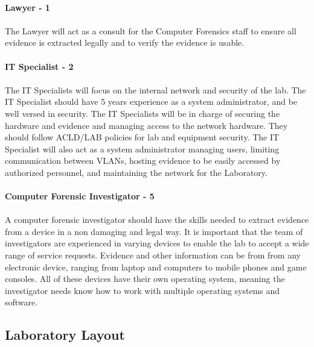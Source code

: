 \documentclass{article}
\begin{document}
\paragraph{Lawyer - 1} 
\paragraph{} The Lawyer will act as a consult for the Computer Forensics staff to ensure all evidence is extracted legally and to verify the evidence is usable.

\paragraph{IT Specialist - 2}
\paragraph{}
The IT Specialists will focus on the internal network and security of the lab.
The IT Specialist should have 5 years experience as a system administrator, and be well versed in security.
The IT Specialists will be in charge of securing the hardware and evidence and managing access to the network hardware.
They should follow ACLD/LAB policies for lab and equipment security.
The IT Specialist will also act as a system administrator managing users, limiting communication between VLANs, hosting evidence to be easily accessed by authorized personnel, and maintaining the network for the Laboratory.

\paragraph{Computer Forensic Investigator - 5}
\paragraph{}
A computer forensic investigator should have the skills needed to extract evidence from a device in a non damaging and legal way.
It is important that the team of investigators are experienced in varying devices to enable the lab to accept a wide range of service requests.
Evidence and other information can be from from any electronic device, ranging from laptop and computers to mobile phones and game consoles.
All of these devices have their own operating system, meaning the investigator needs know how to work with multiple operating systems and software.
\subsection{Laboratory Layout}
\end{document}
